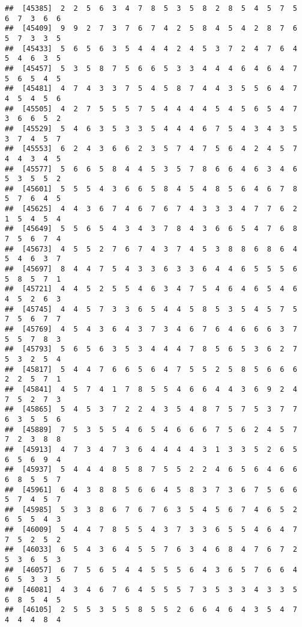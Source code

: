 \documentclass[
]{book}
\begin{document}
\begin{verbatim}
##  [45385]  2  2  5  6  3  4  7  8  5  3  5  8  2  8  5  4  5  7  5  6  7  3  6  6
##  [45409]  9  9  2  7  3  7  6  7  4  2  5  8  4  5  4  2  8  7  6  5  7  3  3  5
##  [45433]  5  6  5  6  3  5  4  4  4  2  4  5  3  7  2  4  7  6  4  5  4  6  3  5
##  [45457]  5  3  5  8  7  5  6  6  5  3  3  4  4  4  6  4  6  4  7  5  6  5  4  5
##  [45481]  4  7  4  3  3  7  5  4  5  8  7  4  4  3  5  5  6  4  7  4  5  4  5  6
##  [45505]  4  2  7  5  5  5  7  5  4  4  4  4  5  4  5  6  5  4  7  3  6  6  5  2
##  [45529]  5  4  6  3  5  3  3  5  4  4  4  6  7  5  4  3  4  3  5  3  7  4  5  7
##  [45553]  6  2  4  3  6  6  2  3  5  7  4  7  5  6  4  2  4  5  7  4  4  3  4  5
##  [45577]  5  6  6  5  8  4  4  5  3  5  7  8  6  6  4  6  3  4  6  5  3  5  5  2
##  [45601]  5  5  5  4  3  6  6  5  8  4  5  4  8  5  6  4  6  7  8  5  7  6  4  5
##  [45625]  4  4  3  6  7  4  6  7  6  7  4  3  3  3  4  7  7  6  2  1  5  4  5  4
##  [45649]  5  5  6  5  4  3  4  3  7  8  4  3  6  6  5  4  7  6  8  7  5  6  7  4
##  [45673]  4  5  5  2  7  6  7  4  3  7  4  5  3  8  8  6  8  6  4  5  4  6  3  7
##  [45697]  8  4  4  7  5  4  3  3  6  3  3  6  4  4  6  5  5  5  6  5  8  5  7  1
##  [45721]  4  4  5  2  5  5  4  6  3  4  7  5  4  6  4  6  5  4  6  4  5  2  6  3
##  [45745]  4  4  5  7  3  3  6  5  4  4  5  8  5  3  5  4  5  7  5  7  5  6  7  7
##  [45769]  4  5  4  3  6  4  3  7  3  4  6  7  6  4  6  6  6  3  7  5  5  7  8  3
##  [45793]  5  6  5  6  3  5  3  4  4  4  7  8  5  6  5  3  6  2  7  5  3  2  5  4
##  [45817]  5  4  4  7  6  6  5  6  4  7  5  5  2  5  8  5  6  6  6  2  2  5  7  1
##  [45841]  4  5  7  4  1  7  8  5  5  4  6  6  4  4  3  6  9  2  4  7  5  2  7  3
##  [45865]  5  4  5  3  7  2  2  4  3  5  4  8  7  5  7  5  3  7  7  6  3  5  5  6
##  [45889]  7  5  3  5  5  4  6  5  4  6  6  6  7  5  6  2  4  5  7  7  2  3  8  8
##  [45913]  4  7  3  4  7  3  6  4  4  4  4  3  1  3  3  5  2  6  5  6  5  6  9  4
##  [45937]  5  4  4  4  8  5  8  7  5  5  2  2  4  6  5  6  4  6  6  6  8  5  5  7
##  [45961]  6  4  3  8  8  5  6  6  4  5  8  3  7  3  6  7  5  6  6  5  7  4  5  7
##  [45985]  5  3  3  8  6  7  6  7  6  3  5  4  5  6  7  4  6  5  2  6  5  5  4  3
##  [46009]  5  4  4  7  8  5  5  4  3  7  3  3  6  5  5  4  6  4  7  7  5  2  5  2
##  [46033]  6  5  4  3  6  4  5  5  7  6  3  4  6  8  4  7  6  7  2  5  3  6  5  3
##  [46057]  6  7  5  6  5  4  4  5  5  5  6  4  3  6  5  7  6  6  4  6  5  3  3  5
##  [46081]  4  3  4  6  7  6  4  5  5  5  7  3  5  3  3  4  3  3  5  6  8  5  4  5
##  [46105]  2  5  5  3  5  5  8  5  5  2  6  6  4  6  4  3  5  4  7  4  4  4  8  4

\end{verbatim}
\end{document}
